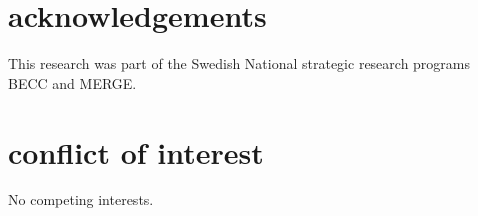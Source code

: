 \documentclass[alpha-refs]{wiley-article}
\begin{document}
\begin{table}[!h]
\centering
\caption{Contribution of profile samples (\%) from 2B-GEOPROF/2B-GEOPROF-LIDAR (2006 -- 2011) which were found to be cloudy, separated into profiles which contain hydrometeors and profiles with at least one continuous cloud layer. All cloud occurrences are displayed for different subregions and separated into day and nighttime.}
\label{tab:profile_stats}
\end{table}





\clearpage

\section*{acknowledgements}
This research was part of the Swedish National strategic research programs BECC and MERGE.

\section*{conflict of interest}
No competing interests. 





\end{document}
